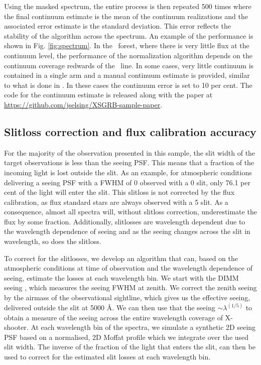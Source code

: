 \documentclass[longauth]{aa}    %
\begin{document}
Using the masked spectrum, the entire process is then repeated 500 times where
the final continuum estimate is the mean of the continuum realizations and the
associated error estimate is the standard deviation. This error reflects the
stability of the algorithm across the spectrum. An example of the performance is
shown in Fig. \ref{fig:spectrum}. In the \lya~forest, where there is very little
flux at the continuum level, the performance of the normalization algorithm
depends on the continuum coverage redwards of the \lya~line. In some cases, very
little continuum is contained in a single arm and a manual continuum estimate is
provided, similar to what is done in \citet{Lopez2016}. In these cases the
continuum error is set to 10 per cent. The code for the continuum estimate is
released along with the paper at
\url{https://github.com/jselsing/XSGRB-sample-paper}.
                                                                                           


\subsection{Slitloss correction and flux calibration accuracy} \label{fluxes}

For the majority of the observation presented in this sample, the slit width of
the target observations is less than the seeing PSF. This means that a fraction
of the incoming light is lost outside the slit. As an example, for atmospheric
conditions delivering a seeing PSF with a FWHM of 0 observed with a
0 slit, only 76.1 per cent of the light will enter the slit. This slitloss
is not corrected by the
flux calibration, as flux standard stars are always observed with a 5 \arcsec
slit. As a consequence, almost all spectra will, without slitloss correction,
underestimate the flux by some fraction. Additionally, slitlosses are wavelength
dependent due to the wavelength dependence of seeing \citep{Boyd1978} and as the
seeing changes across the slit in wavelength, so does the slitloss.

To correct for the slitlosses, we develop an algorithm that can, based on the
atmospheric conditions at time of observation and the wavelength dependence of
seeing, estimate the losses at each wavelength bin. We start with the DIMM
seeing \citep{Sarazin1990}, which measures the seeing FWHM at zenith. We correct
the zenith seeing by the airmass of the observational sightline, which gives us
the effective seeing, delivered outside the slit at 5000 \AA. We can then use
that the seeing $\sim \lambda^(1/5)$ to obtain a measure of the seeing across
the entire wavelength coverage of X-shooter. At each wavelength bin of the
spectra, we simulate a synthetic 2D seeing PSF based on a normalised, 2D Moffat
profile which we integrate over the used slit width. The inverse of the fraction
of the light that enters the slit, can then be used to correct for the estimated
slit losses at each wavelength bin. 
\end{document}
